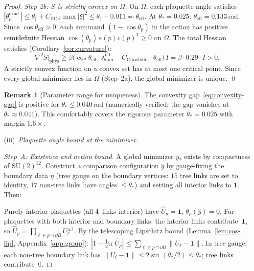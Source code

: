 \documentclass[11pt]{article}
\theoremstyle{definition}
\newtheorem{remark}[theorem]{Remark}
\newcommand{\SU}{\mathrm{SU}}
\newcommand{\tr}{\mathrm{tr}}
\begin{document}
\begin{proof}
\emph{Step 2b: $S$ is strictly convex on $\Omega$.}
On $\Omega$, each plaquette angle satisfies
$|\theta_p^{\mathrm{exact}}|\le\theta_\sharp+C_{\mathrm{BCH}}\max|\xi|^2
\le\theta_\sharp+0.011\eqqcolon\theta_{\mathrm{eff}}$.
At $\theta_*=0.025$: $\theta_{\mathrm{eff}}=0.133$\,rad.
Since $\cos\theta_{\mathrm{eff}}>0$, each summand
$(1-\cos\theta_p)$ in the action has positive semidefinite
Hessian $\cos(\theta_p)\,\varepsilon(p)\varepsilon(p)^T\ge 0$
on $\Omega$.  The total Hessian satisfies
(Corollary~\ref{cor:curvature}):
\begin{equation}\label{eq:convexity-gap}
\nabla^2 S|_{\mathrm{phys}}
\ge\beta\bigl(\cos\theta_{\mathrm{eff}}\cdot\lambda_{\min}^{\mathrm{eff}}
-C_{\mathrm{Christoffel}}\cdot\theta_{\mathrm{eff}}\bigr)\,I
=\beta\cdot 0.29\cdot I>0.
\end{equation}
A strictly convex function on a convex set has at most
one critical point.  Since every global minimizer lies
in $\Omega$ (Step~2a), the global minimizer is unique.
\qed

\begin{remark}[Parameter range for uniqueness]
The convexity gap~\eqref{eq:convexity-gap} is positive for
$\theta_*\le 0.040$\,rad (numerically verified;
the gap vanishes at $\theta_*\approx 0.041$).
This comfortably covers the rigorous parameter
$\theta_*=0.025$ with margin $1.6\times$.
\end{remark}

(iii)~\emph{Plaquette angle bound at the minimizer.}

\emph{Step~A: Existence and action bound.}
A global minimizer $y_*$ exists by compactness of $\SU(2)^{32}$.
Construct a comparison configuration $\hat{y}$ by gauge-fixing
the boundary data $\eta$ (tree gauge on the boundary vertices:
$15$ tree links are set to identity, $17$ non-tree links
have angles $\le\theta_*$) and setting all interior links to
$\mathbf{1}$.  Then:

Purely interior plaquettes (all 4~links interior) have
$\hat{U}_p=\mathbf{1}$, $\theta_p(\hat{y})=0$.
For plaquettes with both interior and boundary links: the
interior links contribute~$\mathbf{1}$, so
$\hat{U}_p=\prod_{\ell\in p\cap\partial B}U_\ell^{\pm 1}$.
By the telescoping Lipschitz bound (Lemma~\ref{lem:cos-lip},
Appendix~\ref{app:group}): $|1-\frac{1}{2}\tr\,\hat{U}_p|
\le\sum_{\ell\in p\cap\partial B}\|U_\ell-\mathbf{1}\|$.
In tree gauge, each non-tree boundary link has
$\|U_\ell-\mathbf{1}\|\le 2\sin(\theta_*/2)\le\theta_*$;
tree links contribute~$0$.


\end{proof}
\end{document}
